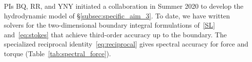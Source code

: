 \begin{table}
\vspace{-5pt}
\caption{\label{tab:spectral_force} 
\footnotesize  Relative numerical errors (rel.~err.)$_F = \max_{i}
  \|\mathbf{F}_i-\mathbf{F}_i^{\text{exact}}\|/\|\mathbf{F}_i^{\text{exact}}\|$
  and (rel.~err.)$_G = \max_{i}
  \|\mathbf{G}_i-\mathbf{G}_i^{\text{exact}}\|/\|\mathbf{G}_i^{\text{exact}}\|$
  for force and torque, respectively, as a function of number of grid
  points $n$ per particle. The data is for $N = 5$ particles; two of
  the particles are nearly touching at a distance 1\% of particle
  diameter.} 
\end{table}
PIs BQ, RR, and YNY initiated a collaboration in Summer 2020 to
develop the hydrodynamic model of \S\ref{subsec:specific_aim_3}.  To
date, we have written solvers for the two-dimensional boundary integral
formulations of~\eqref{SL} and~\eqref{eq:stokes} that achieve
third-order accuracy up to the boundary. The specialized reciprocal
identity~\eqref{eq:reciprocal} gives spectral accuracy for force and
torque (Table~\ref{tab:spectral_force}).

